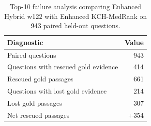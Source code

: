 \begin{table}[t]
\centering
\small
\caption{Top-10 failure analysis comparing Enhanced Hybrid w122 with Enhanced KCH-MedRank on 943 paired held-out questions.}
\label{tab:failure-analysis-summary}
\begin{tabular}{lr}
\toprule
Diagnostic & Value \\
\midrule
Paired questions & 943 \\
Questions with rescued gold evidence & 414 \\
Rescued gold passages & 661 \\
Questions with lost gold evidence & 214 \\
Lost gold passages & 307 \\
Net rescued passages & +354 \\
\bottomrule
\end{tabular}
\end{table}
